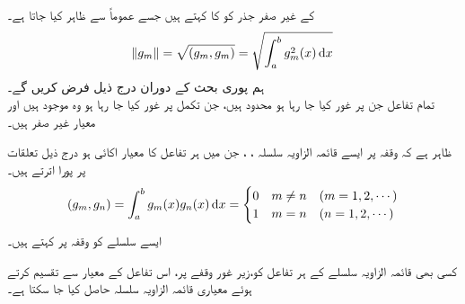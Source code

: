  کے غیر صفر جذر کو  کا  کہتے ہیں جسے عموماً  سے ظاہر کیا جاتا ہے۔
\begin{align}
\norm{g_m}=\sqrt{(g_m,g_m)}=\sqrt{\int_{a}^{b} g_m^2(x)\dif x}
\end{align}
ہم پوری بحث کے دوران درج ذیل فرض کریں گے۔\\
 \quad تمام تفاعل جن پر غور کیا جا رہا ہو محدود ہیں، جن تکمل پر غور کیا جا رہا ہو وہ موجود ہیں اور معیار غیر صفر ہیں۔

 ظاہر ہے کہ وقفہ  پر ایسے قائمہ الزاویہ سلسلہ ، ،  جن  میں ہر تفاعل کا معیار اکائی  ہو درج ذیل تعلقات پر پورا اترتے ہیں۔
\begin{align}
(g_m,g_n)=\int_{a}^{b}g_m(x) g_n(x)\dif x=
\begin{cases}
0 & m\ne n \quad (m=1,2,\cdots)\\
1& m=n \quad (n=1,2,\cdots)
\end{cases}
\end{align}
ایسے سلسلے کو وقفہ  پر  کہتے ہیں۔

کسی بھی قائمہ الزاویہ سلسلے کے ہر تفاعل کو،زیر غور وقفے پر، اس تفاعل کے  معیار سے تقسیم کرتے ہوئے معیاری قائمہ الزاویہ سلسلہ حاصل کیا جا سکتا ہے۔ 

